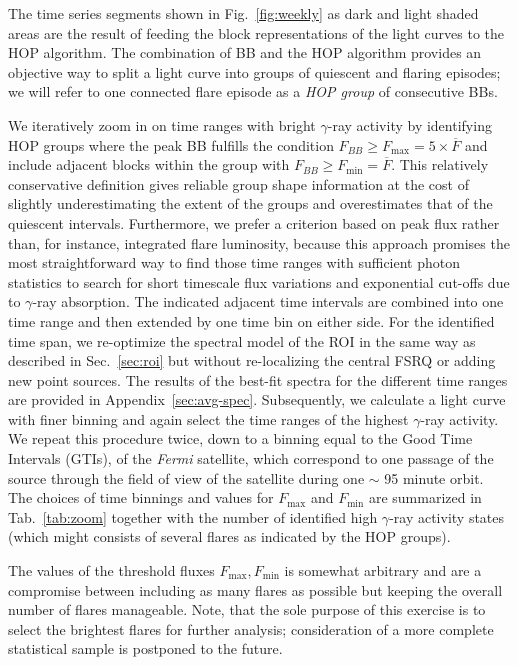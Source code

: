 \documentclass[twocolumn,linenumbers]{aastex62}
\newcommand{\gray}{$\gamma$-ray\xspace}
\newcommand{\Fermi}{\emph{Fermi}\xspace}
\begin{document}
The time series segments shown in 
Fig.~\ref{fig:weekly} as dark and light shaded  areas are the result of feeding
the block representations of the light curves to the HOP algorithm.
The combination of BB and the HOP algorithm provides an objective way to split a light curve into groups of quiescent and flaring episodes; we will refer to one connected flare episode as a \emph{HOP group} of consecutive BBs.

We iteratively zoom in on time ranges with bright \gray activity by identifying HOP groups where the peak BB fulfills the condition $F_{BB} \geqslant F_\mathrm{max} =  5\times\overline{F}$ and include adjacent blocks within the group with $F_{BB} \geqslant F_\mathrm{min} = \overline{F}$. 
This relatively conservative definition 
gives reliable group shape information 
at the cost of 
slightly underestimating the extent of the
groups and overestimates that of the quiescent 
intervals.
Furthermore, we prefer a criterion based on peak flux rather than, for instance, integrated flare luminosity, because this approach promises the most straightforward way to find those time ranges with sufficient photon statistics to search for short timescale flux variations and exponential cut-offs due to \gray absorption. 
The indicated adjacent time intervals are combined into one time range and then extended by one time bin on either side.
For the identified time span, we re-optimize the spectral model of the ROI in the same way as described in Sec.~\ref{sec:roi} but without re-localizing the central FSRQ or adding new point sources. 
The results of the best-fit spectra for the different time ranges are provided in Appendix~\ref{sec:avg-spec}.
Subsequently, we calculate a light curve with finer binning and again select the time ranges of the highest \gray activity. We repeat this procedure twice, down to a binning equal to the Good Time Intervals (GTIs), of the \Fermi satellite, which correspond to one passage of the source through the field of view of the satellite during one $\sim$ 95 minute orbit.
The choices of time binnings and values for $F_\mathrm{max}$ and $F_\mathrm{min}$ are summarized in Tab.~\ref{tab:zoom} together with the number of identified high \gray activity states (which might consists of several flares as indicated by the HOP groups).

The values of the threshold fluxes $F_\mathrm{max}, F_\mathrm{min}$ is somewhat arbitrary and are a compromise between including as many flares as possible but keeping the overall number of flares manageable. Note, that the sole purpose of this exercise is to select the brightest flares for further analysis; consideration of a more
complete statistical sample is postponed to 
the future.
\end{document}
